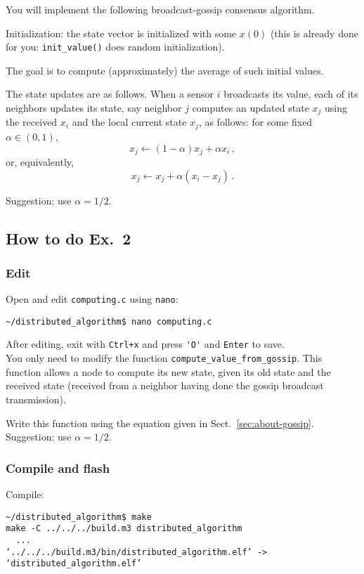 \documentclass[oneside]{article}
\begin{document}
You will implement the following broadcast-gossip consensus algorithm.

Initialization: the state vector is initialized with some $x(0)$ (this is already done for you: \verb=init_value()= does random initialization).

The goal is to compute (approximately) the average of such initial values.

The state updates are as follows. When a sensor $i$ broadcasts its value, each of its neighbors updates its state, say neighbor $j$ computes an updated state $x_j$ using the received $x_i$ and the local current state $x_j$, as follows:
 for some fixed $\alpha \in (0,1)$,
\[ x_j  \leftarrow (1- \alpha) x_j + \alpha x_i \,,\]
 or, equivalently,
\[ x_j \leftarrow x_j + \alpha (x_i-x_j) \,.\]

Suggestion: use $\alpha = 1/2$.

\subsection{How to do Ex.~2}

\subsubsection{Edit}
Open and edit \verb=computing.c= using \verb=nano=:
\begin{verbatim}~/distributed_algorithm$ nano computing.c \end{verbatim}
After editing, exit with \verb=Ctrl+x= and  press \verb='O'= and \verb=Enter= to save.\\
    

You only need to modify the function \verb=compute_value_from_gossip=.
This function allows a node to compute its new state, 
given its old state and the received state
(received from a neighbor having done the gossip broadcast transmission).

Write this function using the equation given in Sect.~\ref{sec:about-gossip}.
Suggestion: use $\alpha = 1/2$.

\subsubsection{Compile and flash}

Compile:
    \begin{verbatim}~/distributed_algorithm$ make
make -C ../../../build.m3 distributed_algorithm
  ...
‘../../../build.m3/bin/distributed_algorithm.elf’ -> ‘distributed_algorithm.elf’
\end{verbatim}
\end{document}
